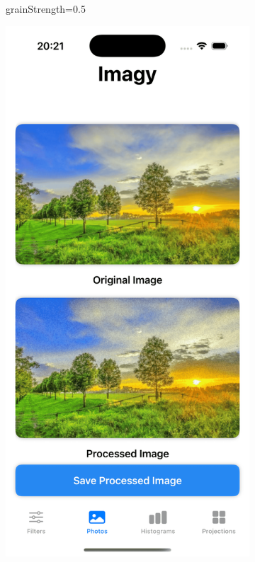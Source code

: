\documentclass[a4paper]{article}
\begin{document}
\begin{figure}[H]
\begin{subfigure}{0.2\textwidth}
        \caption{grainStrength=0.5}
        \label{fig:dog_film_grain_0}
    \end{subfigure}
    \hfill
    \begin{subfigure}{0.2\textwidth}
        \centering
        \includegraphics[width=\linewidth]{images/trees_film_grain_0.06.png}

\end{subfigure}
\end{figure}
\end{document}
